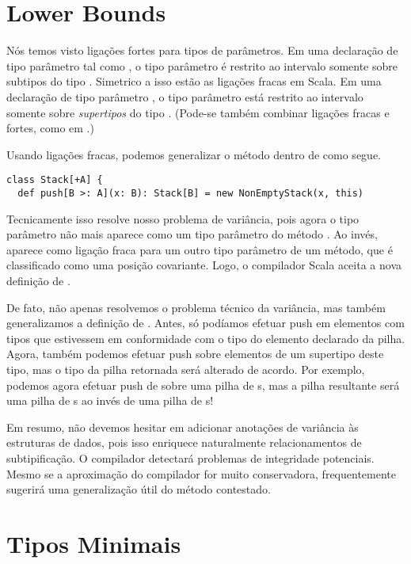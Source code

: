 \section{Lower Bounds}

Nós temos visto ligações fortes para tipos de parâmetros. Em uma declaração 
de tipo parâmetro tal como , o tipo parâmetro  é restrito
ao intervalo somente sobre subtipos do tipo . Simetrico a isso estão as 
ligações fracas em Scala. Em uma declaração de tipo parâmetro , o 
tipo parâmetro  está restrito ao intervalo somente sobre {\em supertipos} 
do tipo . (Pode-se também combinar ligações fracas e fortes, como em .) 

Usando ligações fracas, podemos generalizar o método  dentro de 
como segue.

\begin{lstlisting}
class Stack[+A] {
  def push[B >: A](x: B): Stack[B] = new NonEmptyStack(x, this)
\end{lstlisting}

Tecnicamente isso resolve nosso problema de variância, pois agora o tipo parâmetro 
 não mais aparece como um tipo parâmetro do método . Ao invés, 
aparece como ligação fraca para um outro tipo parâmetro de um método, que é 
classificado como uma posição covariante. Logo, o compilador Scala aceita
a nova definição de . 

De fato, não apenas resolvemos o problema técnico da variância, mas também 
generalizamos a definição de . Antes, só podíamos efetuar push em
elementos com tipos que estivessem em conformidade com o tipo do elemento
declarado da pilha. Agora, também podemos efetuar push sobre elementos de um
supertipo deste tipo, mas o tipo da pilha retornada será alterado de acordo. 
Por exemplo, podemos agora efetuar push de  sobre uma pilha de 
s, mas a pilha resultante será uma pilha de s ao 
invés de uma pilha de s! 

Em resumo, não devemos hesitar em adicionar anotações de variância às estruturas de dados, 
pois isso enriquece naturalmente relacionamentos de subtipificação. O compilador detectará
problemas de integridade potenciais. Mesmo se a aproximação do compilador for muito 
conservadora, frequentemente sugerirá uma generalização útil do método contestado.

\section{Tipos Minimais}

